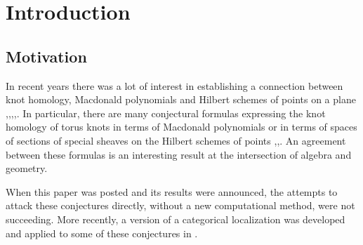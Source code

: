 \documentclass[10pt]{amsart}
\begin{document}


\maketitle
\tableofcontents














\section{Introduction}\label{sec:intro}


\subsection{Motivation}
In recent years there was a lot of interest in establishing a connection between  knot homology, Macdonald polynomials and Hilbert schemes of points on a plane
\cite{AS},\cite{Ch},\cite{GN},\cite{GORS},\cite{ORS}.
In particular, there are many conjectural
formulas expressing the knot homology of torus knots in terms of Macdonald polynomials or in terms of spaces of sections of special sheaves on the Hilbert schemes of points \cite{ORS},\cite{GORS},\cite{GN}. An agreement between these formulas is an interesting result at the intersection of algebra and geometry.
%
%

When this paper was posted and its results were announced, the  attempts to attack these conjectures directly, without a new computational method, were not succeeding. More recently, a version of a categorical localization was developed and applied to some of these conjectures in  \cite{Ho,EHo,Me}.

\end{document}
